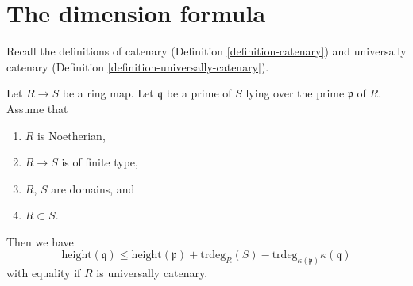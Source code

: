 \section{The dimension formula}
\label{section-dimension-formula}

\noindent
Recall the definitions of catenary (Definition \ref{definition-catenary})
and universally catenary (Definition \ref{definition-universally-catenary}).

\begin{lemma}
\label{lemma-dimension-formula}
Let $R \to S$ be a ring map.
Let $\mathfrak q$ be a prime of $S$ lying over the prime $\mathfrak p$ of $R$.
Assume that
\begin{enumerate}
\item $R$ is Noetherian,
\item $R \to S$ is of finite type,
\item $R$, $S$ are domains, and
\item $R \subset S$.
\end{enumerate}
Then we have
$$
\text{height}(\mathfrak q)
\leq
\text{height}(\mathfrak p) + \text{trdeg}_R(S)
- \text{trdeg}_{\kappa(\mathfrak p)} \kappa(\mathfrak q)
$$
with equality if $R$ is universally catenary.
\end{lemma}

